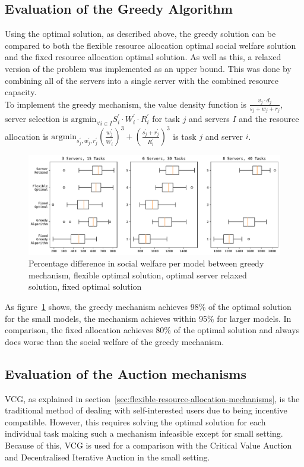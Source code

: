 \subsection{Evaluation of the Greedy Algorithm}
\label{subsec:evaluation-of-the-greedy-algorithm}
Using the optimal solution, as described above, the greedy solution can be compared to both the flexible resource
allocation optimal social welfare solution and the fixed resource allocation optimal solution. As well as this, a
relaxed version of the problem was implemented as an upper bound. This was done by combining all of the servers into
a single server with the combined resource capacity. \\
To implement the greedy mechanism, the value density function is $\frac{v_j \cdot d_j}{s_j + w_j + r_j}$, server selection
is $\text{argmin}_{\forall i \in I} S^{'}_i \cdot W^{'}_i \cdot R^{'}_i$ for task $j$ and servers $I$ and the resource
allocation is $\text{argmin}_{s^{'}_j, w^{'}_j, r^{'}_j} \left(\frac{w^{'}_j}{W^{'}_i}\right)^3 + \left(\frac{s^{'}_j + r^{'}_j}{R^{'}_i}\right)^3$
is task $j$ and server $i$.

\begin{figure}
    \centering
    \includegraphics[width=\linewidth]{figs/greedy/multi_setting_social_welfare.pdf}
    \caption{Percentage difference in social welfare per model between greedy mechanism, flexible optimal solution,
             optimal server relaxed solution, fixed optimal solution}
    \label{fig:greedy-mechanism-comparison}
\end{figure}
As figure~\ref{fig:greedy-mechanism-comparison} shows, the greedy mechanism achieves 98\% of the optimal solution for
the small models, the mechanism achieves within 95\% for larger models. In comparison, the fixed allocation achieves
80\% of the optimal solution and always does worse than the social welfare of the greedy mechanism.

\subsection{Evaluation of the Auction mechanisms}\label{subsec:evaluation-of-the-auction-mechanisms}
VCG, as explained in section~\ref{sec:flexible-resource-allocation-mechanisms}, is the traditional method of dealing
with self-interested users due to being incentive compatible. However, this requires solving the optimal solution
for each individual task making such a mechanism infeasible except for small setting. Because of this, VCG is used for
a comparison with the Critical Value Auction and Decentralised Iterative Auction in the small setting.

